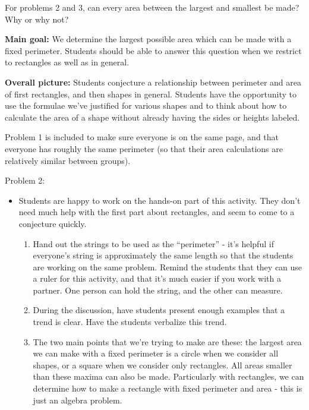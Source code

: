 \documentclass[noauthor,nooutcomes, handout]{ximera}
\begin{document}
\begin{problem} For problems 2 and 3, can every area between the largest and smallest be made?  Why or why not?






\end{problem}


\newpage

\begin{instructorNotes}
{\bf Main goal:} We determine the largest possible area which can be made with a fixed perimeter. Students should be able to answer this question when we restrict to rectangles as well as in general.


{\bf Overall picture:}  Students conjecture a relationship between perimeter and area of first rectangles, and then shapes in general.  Students have the opportunity to use the formulae we've justified for various shapes and to think about how to calculate the area of a shape without already having the sides or heights labeled.

Problem 1 is included to make sure everyone is on the same page, and that everyone has roughly the same perimeter (so that their area calculations are relatively similar between groups). 

Problem 2: 
\begin{itemize}
\item Students are happy to work on the hands-on part of this activity.  They don't need much help with the first part about rectangles, and seem to come to a conjecture quickly.
\begin{enumerate}
\item Hand out the strings to be used as the ``perimeter'' - it's helpful if everyone's string is approximately the same length so that the students are working on the same problem.  Remind the students that they can use a ruler for this activity, and that it's much easier if you work with a partner.  One person can hold the string, and the other can measure.
	\item During the discussion, have students present enough examples that a trend is clear.  Have the students verbalize this trend.
	\item The two main points that we're trying to make are these: the largest area we can make with a fixed perimeter is a circle when we consider all shapes, or a square when we consider only rectangles.  All areas smaller than these maxima can also be made.  Particularly with rectangles, we can determine how to make a rectangle with fixed perimeter and area - this is just an algebra problem.


\end{enumerate}
\end{itemize}
\end{instructorNotes}
\end{document}
